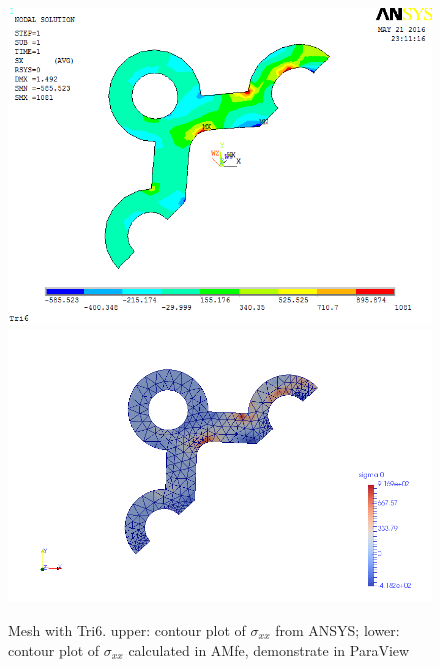 \begin{figure}[htbp]
	\begin{center}
		\includegraphics[width=13cm,clip]{Tri6_Sxx.png} 		
		\includegraphics[width=13cm,clip]{Tri6_Sxx_P.png} 		
		\caption{Mesh with Tri6. upper: contour plot of $\sigma_{xx}$ from ANSYS; lower: contour plot of $\sigma_{xx}$ calculated in AMfe, demonstrate in ParaView} \label{fig: Tri6_Sxx}
	\end{center}
\end{figure}
\clearpage 

